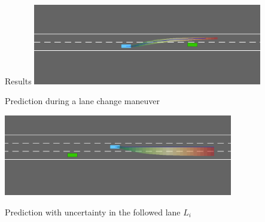 \documentclass[slideopt,A4,showboxes,svgnames]{beamer}
\begin{document}
\begin{frame}{Results}
\centering
\vspace*{\baselineskip}
\href{https://eleurent.github.io/interval-prediction/\#novel-interval-predictor}{
\includegraphics[width=0.75\textwidth]{../img/lane_change_predictor.png}}

Prediction during a lane change maneuver

\href{https://eleurent.github.io/interval-prediction/\#right-hand-traffic}{
\includegraphics[width=0.75\textwidth]{../img/overtake.png}}

Prediction with uncertainty in the followed lane $L_i$
\end{frame}
\end{document}

